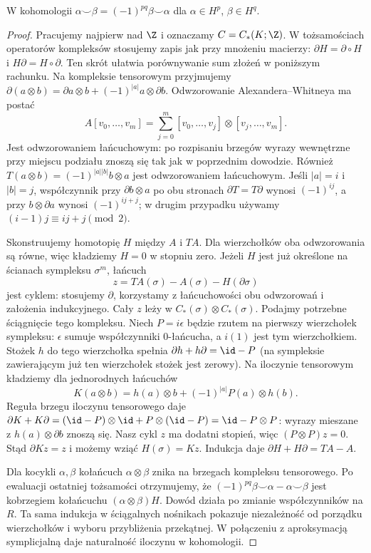\begin{stwierdzenie}
\label{prop:kubek-graded-16}
W kohomologii
$\alpha\smile\beta
=(-1)^{pq}\beta\smile\alpha$
dla $\alpha\in H^p$,
$\beta\in H^q$.
\end{stwierdzenie}
\begin{proof}
Pracujemy najpierw nad $\Z$ i oznaczamy $C=C_*(K;\Z)$.
W tożsamościach operatorów kompleksów stosujemy zapis
jak przy mnożeniu macierzy: $\partial H=\partial\circ H$
i $H\partial=H\circ\partial$.
Ten skrót ułatwia porównywanie sum złożeń w poniższym rachunku.
Na kompleksie tensorowym przyjmujemy
$\partial(a\otimes b)=\partial a\otimes b+(-1)^{|a|}a\otimes\partial b$.
Odwzorowanie Alexandera--Whitneya ma postać
\[
 A[v_0,\ldots,v_m]
 =\sum_{j=0}^m[v_0,\ldots,v_j]\otimes[v_j,\ldots,v_m].
\]
Jest odwzorowaniem łańcuchowym: po rozpisaniu brzegów
wyrazy wewnętrzne przy miejscu podziału znoszą się
tak jak w poprzednim dowodzie. Również
$T(a\otimes b)=(-1)^{|a||b|}b\otimes a$
jest odwzorowaniem łańcuchowym.
Jeśli $|a|=i$ i $|b|=j$, współczynnik przy
$\partial b\otimes a$ po obu stronach $\partial T=T\partial$
wynosi $(-1)^{ij}$, a przy $b\otimes\partial a$ wynosi
$(-1)^{ij+j}$; w drugim przypadku używamy
$(i-1)j\equiv ij+j\pmod2$.

Skonstruujemy homotopię $H$ między $A$ i $TA$.
Dla wierzchołków oba odwzorowania są równe, więc
kładziemy $H=0$ w stopniu zero. Jeżeli $H$ jest
już określone na ścianach sympleksu $\sigma^m$,
łańcuch
\[
 z=TA(\sigma)-A(\sigma)-H(\partial\sigma)
\]
jest cyklem: stosujemy $\partial$, korzystamy
z łańcuchowości obu odwzorowań i założenia indukcyjnego.
Cały $z$ leży w $C_*(\sigma)\otimes C_*(\sigma)$.
Podajmy potrzebne ściągnięcie tego kompleksu.
Niech $P=i\epsilon$ będzie rzutem na pierwszy wierzchołek
sympleksu: $\epsilon$ sumuje współczynniki $0$-łańcucha,
a $i(1)$ jest tym wierzchołkiem.
Stożek $h$ do tego wierzchołka spełnia
$\partial h+h\partial=\id-P$
(na sympleksie zawierającym już ten wierzchołek stożek
jest zerowy).
Na iloczynie tensorowym kładziemy dla jednorodnych łańcuchów
\[
 K(a\otimes b)=h(a)\otimes b+(-1)^{|a|}P(a)\otimes h(b).
\]
Reguła brzegu iloczynu tensorowego daje
$\partial K+K\partial
=(\id-P)\otimes\id+P\otimes(\id-P)=\id-P\otimes P$:
wyrazy mieszane z $h(a)\otimes\partial b$ znoszą się.
Nasz cykl $z$ ma dodatni stopień, więc $(P\otimes P)z=0$.
Stąd $\partial Kz=z$ i możemy wziąć $H(\sigma)=Kz$.
Indukcja daje $\partial H+H\partial=TA-A$.

Dla kocykli $\alpha,\beta$ kołańcuch
$\alpha\otimes\beta$ znika na brzegach kompleksu
tensorowego. Po ewaluacji ostatniej tożsamości
otrzymujemy, że
$(-1)^{pq}\beta\smile\alpha-\alpha\smile\beta$
jest kobrzegiem kołańcuchu $(\alpha\otimes\beta)H$.
Dowód działa po zmianie współczynników na $R$.
Ta sama indukcja w ściągalnych nośnikach pokazuje
niezależność od porządku wierzchołków i wyboru
przybliżenia przekątnej. W połączeniu z aproksymacją
symplicjalną daje naturalność iloczynu w kohomologii.
\end{proof}


